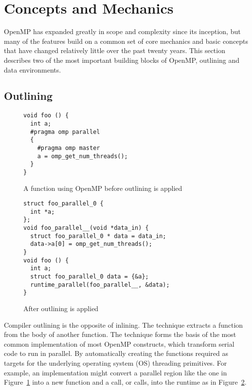 \section{Concepts and Mechanics}
\label{sec:concepts}

OpenMP has expanded greatly in scope and complexity since its inception, but
many of the features build on a common set of core mechanics and basic concepts
that have changed relatively little over the past twenty years.  This section
describes two of the most important building blocks of OpenMP, outlining and
data environments.

\subsection{Outlining}
\label{sub:outlining}

\begin{figure}
\begin{verbatim}
void foo () {
  int a;
  #pragma omp parallel
  {
    #pragma omp master
    a = omp_get_num_threads();
  }
}
\end{verbatim}
\caption{A function using OpenMP before outlining is applied}
\label{fig:outline-before}
\end{figure}

\begin{figure}
\begin{verbatim}
struct foo_parallel_0 {
  int *a;
};
void foo_parallel__(void *data_in) {
  struct foo_parallel_0 * data = data_in;
  data->a[0] = omp_get_num_threads();
}
void foo () {
  int a;
  struct foo_parallel_0 data = {&a};
  runtime_parallel(foo_parallel__, &data);
}
\end{verbatim}
\caption{After outlining is applied}
\label{fig:outline-after}
\end{figure}

Compiler outlining is the opposite of inlining. The technique extracts a 
function from the body of another function. The technique forms the basis 
of the most common implementation of most OpenMP constructs, which transform
serial code to run in parallel. By automatically creating the 
functions required as targets for the underlying operating system (OS) 
threading primitives. For example, an implementation might convert a 
parallel region like the one in Figure~\ref{fig:outline-before} into a 
new function and a call, or calls, into the runtime as in 
Figure~\ref{fig:outline-after}.

